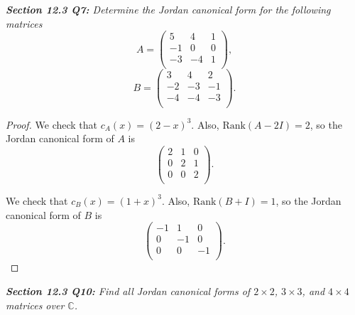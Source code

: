 \documentclass{article}
\begin{document}
\it \textbf{Section 12.3 Q7:} Determine the Jordan canonical form for the
  following matrices
  \[A =\begin{pmatrix} 5&4&1\\ -1&0&0\\ -3&-4&1\\ \end{pmatrix},\]
  \[B =\begin{pmatrix} 3&4&2\\ -2&-3&-1\\ -4&-4&-3\\ \end{pmatrix}.\]

  \begin{proof}
    We check that $c_A(x)=(2-x)^3$. Also, $\text{Rank}(A-2I)=2$, so the
    Jordan canonical form of $A$ is
    \[\begin{pmatrix} 2&1&0\\ 0&2&1\\ 0&0&2\\ \end{pmatrix}.\]

    We check that $c_B(x)=(1+x)^3$. Also, $\text{Rank}(B+I)=1$, so the
    Jordan canonical form of $B$ is
    \[\begin{pmatrix} -1&1&0\\ 0&-1&0\\ 0&0&-1\\ \end{pmatrix}.\]
  \end{proof}

\it \textbf{Section 12.3 Q10:} Find all Jordan canonical forms of
  $2\times2$, $3\times3$, and $4\times4$ matrices over $\mathbb{C}$.
\end{document}
